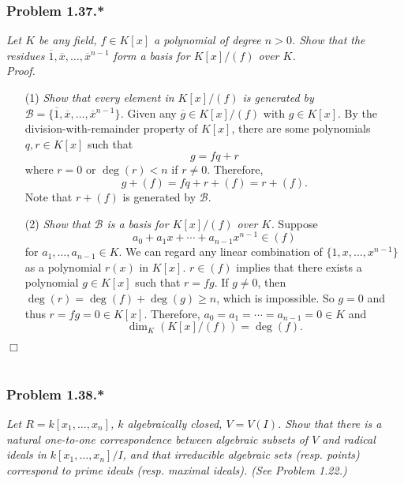 \documentclass{article}
\begin{document}



\subsubsection*{Problem 1.37.*}
\emph{Let $K$ be any field, $f \in K[x]$ a polynomial of degree $n > 0$.
Show that the residues $\overline{1}, \overline{x}, \ldots, \overline{x}^{n-1}$
form a basis for $K[x]/(f)$ over $K$.} \\

\emph{Proof.}
\begin{enumerate}
\item[(1)]
  \emph{Show that every element in $K[x]/(f)$ is generated by
  $\mathscr{B} = \{ \overline{1}, \overline{x}, \ldots, \overline{x}^{n-1} \}$.}
  Given any $\overline{g} \in K[x]/(f)$ with $g \in K[x]$.
  By the division-with-remainder property of $K[x]$,
  there are some polynomials $q, r \in K[x]$ such that
  \[
    g = fq + r
  \]
  where $r = 0$ or $\deg(r) < n$ if $r \neq 0$.
  Therefore,
  \[
    g + (f) = fq + r + (f) = r + (f).
  \]
  Note that $r + (f)$ is generated by $\mathscr{B}$.

\item[(2)]
  \emph{Show that $\mathscr{B}$ is a basis for $K[x]/(f)$ over $K$.}
  Suppose
  \[
    a_0 + a_1 x + \cdots + a_{n-1} x^{n-1} \in (f)
  \]
  for $a_1, \ldots, a_{n-1} \in K$.
  We can regard any linear combination of $\{ 1, x, \ldots, x^{n-1} \}$
  as a polynomial $r(x)$ in $K[x]$.
  $r \in (f)$ implies that there exists a polynomial $g \in K[x]$
  such that $r = fg$.
  If $g \neq 0$, then $\deg(r) = \deg(f) + \deg(g) \geq n$, which is impossible.
  So $g = 0$ and thus $r = fg = 0 \in K[x]$.
  Therefore, $a_0 = a_1 = \cdots = a_{n-1} = 0 \in K$ and
  \[
    \dim_{K}(K[x]/(f)) = \deg(f).
  \]
\end{enumerate}
$\Box$ \\\\






\subsubsection*{Problem 1.38.*}
\emph{Let $R = k[x_1,\ldots,x_n]$, $k$ algebraically closed, $V = V(I)$.
Show that there is a natural one-to-one correspondence
between algebraic subsets of $V$ and radical ideals in $k[x_1,\ldots,x_n]/I$,
and that irreducible algebraic sets (resp. points) correspond to prime ideals (resp. maximal ideals).
(See Problem 1.22.)} \\
\end{document}
